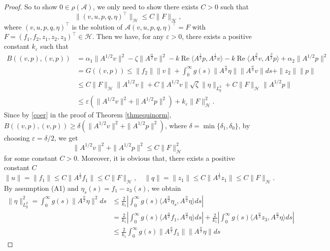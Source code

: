 \documentclass[12pt,reqno]{article}
\begin{document}
\begin{proof}
		So to show $0\in\rho(\mathcal{A})$, we only need to show there exists $C>0$ such that
		\begin{equation}\label{yjgj}
			\|(v,u,p,q,\eta)^\top\|_{\mathcal{H}} \leq C\|F\|_{\mathcal{H}},
		\end{equation}where $(v,u,p,q,\eta)^\top$ is the solution of \(
		\mathcal{A}(v,u,p,q,\eta)^\top = F
		\) with $F = (f_1, f_2, z_1, z_2, z_3)^\top \in \mathcal{H}$.
		Then we have, for any $\varepsilon>0$, there exists a positive constant $k_\varepsilon$ such that
		\begin{align*}
			B((v,p),(v,p)) &= \alpha_1\|A^{1/2}v\|^2 - \zeta\|A^{\frac{\alpha}{2}}v\|^2 - k\operatorname{Re}\langle A^{\frac{1}{2}}p,A^{\frac{1}{2}}v\rangle-k\operatorname{Re}\langle A^{\frac{\beta}{2}}v,A^{\frac{\beta}{2}}p\rangle
			+ \alpha_2\|A^{1/2}p\|^2 \\
			&= G((v,p))\leq \|f_2\|\|v\| + \int_0^\infty g(s)\|A^{\frac{\alpha}{2}}\eta\|\|A^{\frac{\alpha}{2}}v\|ds + \|z_2\|\|p\| \\
			&\leq C\|F\|_{\mathcal{H}}\|A^{1/2}v\| + C\|A^{1/2}v\|\sqrt{\zeta}\|\eta\|_{L_g^2} + C\|F\|_{\mathcal{H}}\|A^{1/2}p\| \\
			&\leq \varepsilon\left(\|A^{1/2}v\|^2+\|A^{1/2}p\|^2\right) + k_\varepsilon\|F\|_{\mathcal{H}}^2.
		\end{align*}
		Since by \eqref{coer} in the proof of Theorem \ref{thmequinorm}, $B((v,p),(v,p))\ge\delta\left(\|A^{1/2}v\|^2+\|A^{1/2}p\|^2\right)$, where $\delta=\min\{\delta_1,\delta_0\}$, by choosing $\varepsilon=\delta/2$, we get
		$$\|A^{1/2}v\|^2+\|A^{1/2}p\|^2\leq C \|F\|_{\mathcal{H}}^2$$ for some constant $C>0$.
		Moreover, it is obvious that, there exists a positive constant $C$
		\[
		\|u\| = \|f_1\| \leq C\|A^{\frac{1}{2}}f_1\|
		\leq C\|F\|_{\mathcal{H}},\quad
		\|q\| = \|z_1\| \leq C\|A^{\frac{1}{2}}z_1\|
		\leq C\|F\|_{\mathcal{H}}.
		\]
		By assumption (A1) and $\eta_s(s)=f_1-z_3(s)$, we obtain
		\begin{align*}
			\|\eta\|_{L_g^2}^2= \int_0^\infty g(s) \| A^{\frac{\alpha}{2}} \eta \|^2 ds
			&\leq \frac{2}{k_1} \left| \int_0^\infty g(s) \langle A^{\frac{\alpha}{2}} \eta_s, A^{\frac{\alpha}{2}} \eta \rangle ds \right| \\
			&= \frac{2}{k_1} \left| \int_0^\infty g(s) \langle A^{\frac{\alpha}{2}} f_1, A^{\frac{\alpha}{2}} \eta \rangle ds \right|
			+ \frac{2}{k_1} | \int_0^\infty g(s) \langle A^{\frac{\alpha}{2}} z_3, A^{\frac{\alpha}{2}} \eta \rangle ds | \\
			&\leq \frac{2}{k_1} \int_0^\infty g(s) \| A^{\frac{\alpha}{2}} f_1 \| \| A^{\frac{\alpha}{2}} \eta \| ds

\end{align*}
\end{proof}
\end{document}
